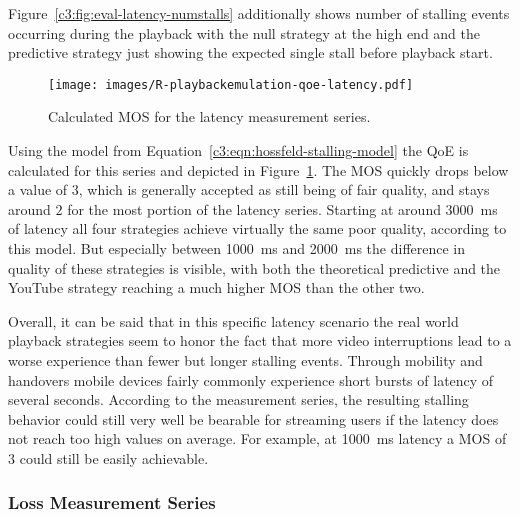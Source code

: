 Figure~\ref{c3:fig:eval-latency-numstalls} additionally shows number of stalling events occurring during the playback with the null strategy at the high end and the predictive strategy just showing the expected single stall before playback start.

\begin{figure}[htb]
	\centering
	\texttt{[image: images/R-playbackemulation-qoe-latency.pdf]}
	\caption{Calculated \acrshort{MOS} for the latency measurement series.}
\label{c3:fig:eval-latency-qoe}
\end{figure}

Using the model from Equation~\ref{c3:eqn:hossfeld-stalling-model} the \gls{QoE} is calculated for this series and depicted in Figure~\ref{c3:fig:eval-latency-qoe}. The \gls{MOS} quickly drops below a value of $3$, which is generally accepted as still being of fair quality, and stays around $2$ for the most portion of the latency series. Starting at around \SI{3000}{\milli\second} of latency all four strategies achieve virtually the same poor quality, according to this model. But especially between \SI{1000}{\milli\second} and \SI{2000}{\milli\second} the difference in quality of these strategies is visible, with both the theoretical predictive and the YouTube strategy reaching a much higher \gls{MOS} than the other two.

Overall, it can be said that in this specific latency scenario the real world playback strategies seem to honor the fact that more video interruptions lead to a worse experience than fewer but longer stalling events. Through mobility and handovers mobile devices fairly commonly experience short bursts of latency of several seconds. According to the measurement series, the resulting stalling behavior could still very well be bearable for streaming users if the latency does not reach too high values on average. For example, at \SI{1000}{\milli\second} latency a \gls{MOS} of $3$ could still be easily achievable.

\subsubsection{Loss Measurement Series}

